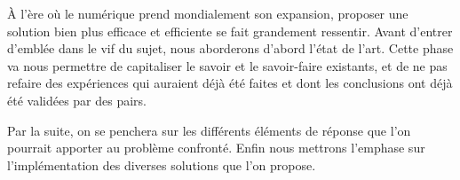 À l'ère où le numérique prend mondialement son expansion, proposer une solution bien plus 
efficace et efficiente se fait grandement ressentir. 
Avant d'entrer d'emblée dans le vif du sujet, nous aborderons 
d'abord l'état de l'art. Cette phase va nous permettre de capitaliser le 
savoir et le savoir-faire existants, et de ne pas refaire des expériences 
qui auraient déjà été faites et dont les conclusions ont déjà été validées 
par des pairs.
\par
Par la suite, on se penchera sur les différents éléments de réponse que l'on 
pourrait apporter au problème confronté.
Enfin nous mettrons l'emphase sur l'implémentation des diverses solutions 
que l'on propose.
